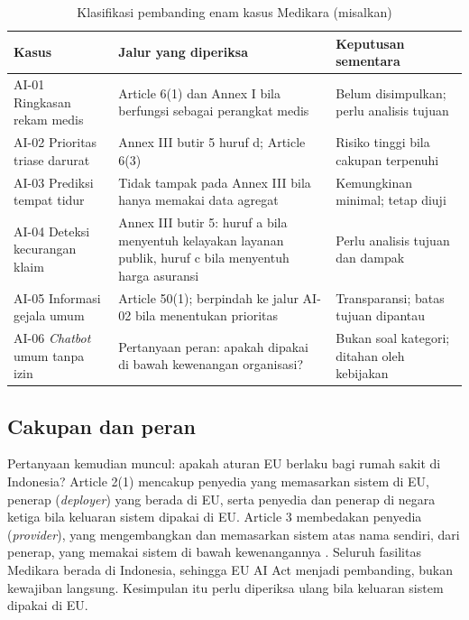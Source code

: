 \begin{table}[!htb]
  \centering\small
  \caption{Klasifikasi pembanding enam kasus Medikara (misalkan)}\label{tab:ch11-kategori-eu}
  \begin{tabularx}{\textwidth}{|>{\raggedright\arraybackslash}p{}|>{\raggedright\arraybackslash}X|>{\raggedright\arraybackslash}X|}
    \hline
    \textbf{Kasus} & \textbf{Jalur yang diperiksa} & \textbf{Keputusan sementara} \\ \hline
    AI-01 Ringkasan rekam medis & Article 6(1) dan Annex I bila berfungsi sebagai perangkat medis &
    Belum disimpulkan; perlu analisis tujuan \\ \hline
    AI-02 Prioritas triase darurat & Annex III butir 5 huruf d; Article 6(3) & Risiko tinggi bila
    cakupan terpenuhi \\ \hline
    AI-03 Prediksi tempat tidur & Tidak tampak pada Annex III bila hanya memakai data agregat &
    Kemungkinan minimal; tetap diuji \\ \hline
    AI-04 Deteksi kecurangan klaim & Annex III butir 5: huruf a bila menyentuh kelayakan layanan
    publik, huruf c bila menyentuh harga asuransi & Perlu analisis tujuan dan dampak \\ \hline
    AI-05 Informasi gejala umum & Article 50(1); berpindah ke jalur AI-02 bila menentukan prioritas
    & Transparansi; batas tujuan dipantau \\ \hline
    AI-06 \textit{Chatbot} umum tanpa izin & Pertanyaan peran: apakah dipakai di bawah kewenangan
    organisasi? & Bukan soal kategori; ditahan oleh kebijakan \\ \hline
  \end{tabularx}
\end{table}

\subsection*{Cakupan dan peran}

Pertanyaan kemudian muncul: apakah aturan EU berlaku bagi rumah sakit di Indonesia? Article 2(1)
mencakup penyedia yang memasarkan sistem di EU, penerap (\textit{deployer}) yang berada di EU, serta
penyedia dan penerap di negara ketiga bila keluaran sistem dipakai di EU. Article 3 membedakan
penyedia (\textit{provider}), yang mengembangkan dan memasarkan sistem atas nama sendiri, dari
penerap, yang memakai sistem di bawah kewenangannya \cite{c11-aiact-explorer}. Seluruh fasilitas
Medikara berada di Indonesia, sehingga EU AI Act menjadi pembanding, bukan kewajiban langsung.
Kesimpulan itu perlu diperiksa ulang bila keluaran sistem dipakai di EU.

